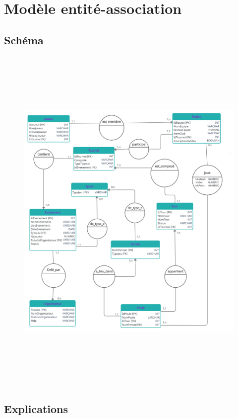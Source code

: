 \documentclass[a4paper,12pt]{report}   %
\begin{document}
\chapter*{Modèle entité-association}

\section*{Schéma}

\begin{center}
	\begin{figure}[!h]
          \includegraphics[height=17.5cm,width=17cm]{EA.png}
    \end{figure}
\end{center}
 
 
\section*{Explications}
\vspace{.5cm}
\end{document}
